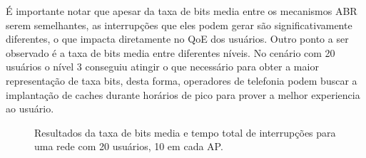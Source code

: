 É importante notar que apesar da taxa de bits media entre os mecanismos ABR serem semelhantes, as interrupções que eles podem gerar são significativamente diferentes, o que impacta diretamente no QoE dos usuários. Outro ponto a ser observado é a taxa de bits media entre diferentes níveis. No cenário com 20 usuários o nível 3 conseguiu atingir o que necessário para obter a maior representação de taxa bits, desta forma, operadores de telefonia podem buscar a implantação de caches durante horários de pico para prover a melhor experiencia ao usuário.

%
%


\vspace{0.8cm}
\begin{figure}[htb]
  \centering
  \hfil \hspace{1cm}
  \caption{Resultados da taxa de bits media e tempo total de interrupções para uma rede com 20 usuários, 10 em cada AP.}
  \label{fig:dmm}
\end{figure}

